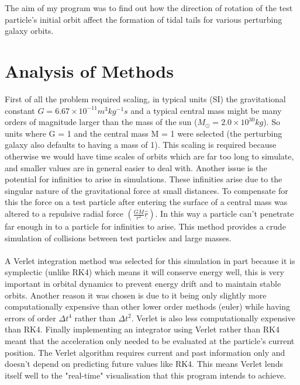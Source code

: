 \documentclass[10pt,a4paper]{article}
\begin{document}
\\
\\
The aim of my program was to find out how the direction of rotation of the test particle's initial orbit affect the formation of tidal tails for various perturbing galaxy orbits.

\clearpage
\section{Analysis of Methods}
First of all the problem required scaling, in typical units (SI) the gravitational constant $G=6.67\times10^{-11} m^3 kg^{-1} s$ and a typical central mass might be many orders of magnitude larger than the mass of the sun ($M_\odot=2.0\times10^{30 } kg$). So units where G = 1 and the central mass M = 1 were selected (the perturbing galaxy also defaults to having a mass of 1). This scaling is required because otherwise we would have time scales of orbits which are far too long to simulate, and smaller values are in general easier to deal with. Another issue is the potential for infinities to arise in simulations. These infinities arise due to the singular nature of the gravitational force at small distances. To compensate for this the force on a test particle after entering the surface of a central mass was altered to a repulsive radial force $(\frac{GM}{r^2} \underline{\hat{r}})$. In this way a particle can't penetrate far enough in to a particle for infinities to arise. This method provides a crude simulation of collisions between test particles and large masses.
\\
\\
A Verlet integration method was selected for this simulation in part because it is symplectic (unlike RK4) which means it will conserve energy well, this is very important in orbital dynamics to prevent energy drift and to maintain stable orbits. Another reason it was chosen is due to it being only slightly more computationally expensive than other lower order methods (euler) while having errors of order $\Delta t^4$ rather than $\Delta t^2$. Verlet is also less computationally expensive than RK4. Finally implementing an integrator using Verlet rather than RK4 meant that the acceleration only needed to be evaluated at the particle's current position. The Verlet algorithm requires current and past information only and doesn't depend on predicting future values like RK4. This means Verlet lends itself well to the "real-time" visualisation that this program intends to achieve.
\\
\end{document}
